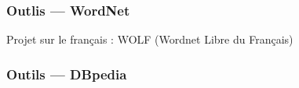 \begin{frame}
  \frametitle{Outlis --- WordNet}
  Projet sur le français : WOLF (Wordnet Libre du Français) 
\end{frame}

\begin{frame}
  \frametitle{Outils --- DBpedia}
\end{frame}



